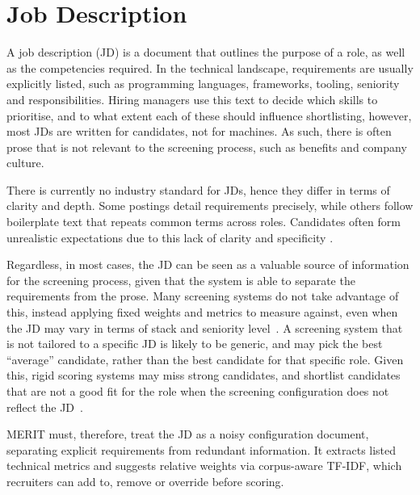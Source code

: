 \section{Job Description}

A job description (JD) is a document that outlines the purpose of a role, as well as the competencies required.
In the technical landscape, requirements are usually explicitly listed, such as programming languages, frameworks,
tooling, seniority and responsibilities. Hiring managers use this text to decide which skills to prioritise,
and to what extent each of these should influence shortlisting, however, most JDs are written for candidates,
not for machines. As such, there is often prose that is not relevant to the screening process, such as benefits and company culture.

There is currently no industry standard for JDs, hence they differ in terms of clarity and depth.
Some postings detail requirements precisely, while others follow boilerplate text that repeats common terms across roles.
Candidates often form unrealistic expectations due to this lack of clarity and specificity \cite{breaugh1983,earnest2011}. 

Regardless, in most cases, the JD can be seen as a valuable source of information for the screening process, given that
the system is able to separate the requirements from the prose. Many screening systems do not take advantage of this, instead
applying fixed weights and metrics to measure against, even when the JD may vary in terms of stack and seniority level~\cite{gugnani2020,lo2025aihiring}.
A screening system that is not tailored to a specific JD is likely to be generic, and may pick the best ``average'' candidate,
rather than the best candidate for that specific role. Given this, rigid scoring systems may miss strong candidates, and
shortlist candidates that are not a good fit for the role when the screening configuration does not reflect the JD~\cite{fuller2021hiddenworkers}.

MERIT must, therefore, treat the JD as a noisy configuration document, separating explicit requirements from redundant
information. It extracts listed technical metrics and suggests relative weights via corpus-aware TF-IDF, which recruiters
can add to, remove or override before scoring.
